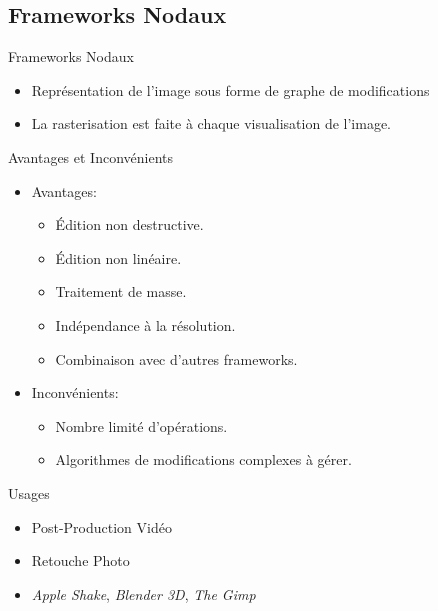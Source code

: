 \documentclass[slidetop,compress,mathserif]{beamer}
\begin{document}
	\subsection{Frameworks Nodaux}
	\begin{frame}{Frameworks Nodaux}
		\begin{itemize}
		\item Représentation de l'image sous forme de graphe de modifications
		\item La rasterisation est faite à chaque visualisation de l'image. 
		\end{itemize}
	\end{frame}
	\begin{frame}{Avantages et Inconvénients}
		\begin{itemize}
			\item Avantages: 
			\begin{itemize}
				\item Édition non destructive.
				\item Édition non linéaire.
				\item Traitement de masse.
				\item Indépendance à la résolution.
				\item Combinaison avec d'autres frameworks.
			\end{itemize}
			\pause
			\item Inconvénients: 
			\begin{itemize}
				\item Nombre limité d'opérations.
				\item Algorithmes de modifications complexes à gérer.
			\end{itemize}
		\end{itemize}
	\end{frame}
	
	\begin{frame}{Usages}
		\begin{itemize}
			\item Post-Production Vidéo
			\item Retouche Photo
			\pause
			\item \emph{ Apple Shake}, \emph{Blender 3D}, \emph{The Gimp}
		\end{itemize}
	\end{frame}
\end{document}

